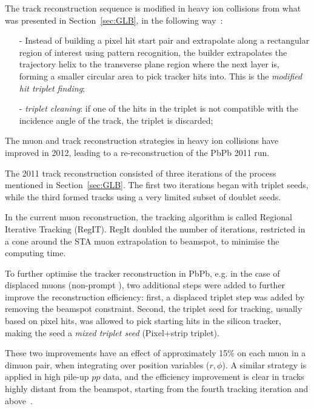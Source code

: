 The track reconstruction sequence is modified in heavy ion collisions from what
was presented in Section~\ref{sec:GLB}, in the following way~\cite{Denterria:2007xr}:

\begin{itemize}
\item[-] Instead of building a pixel hit start pair and extrapolate
  along a rectangular region of interest using pattern recognition,
  the builder extrapolates the trajectory helix to the transverse plane
  region where the next layer is, forming a smaller circular area to
  pick tracker hits into. This is the \textit{modified hit triplet finding};
\item[-] \textit{triplet cleaning}: if one of the hits in the triplet is not compatible with the
  incidence angle of the track, the triplet is discarded;
\end{itemize}


The muon and track reconstruction strategies in heavy ion collisions have improved in 2012, leading to a
re-reconstruction of the PbPb 2011 run. 

The 2011 track reconstruction consisted of three iterations of the
process mentioned in Section~\ref{sec:GLB}. The first two iterations
began with triplet seeds, while the third formed tracks using a
very limited subset of doublet seeds. 


In the current muon
reconstruction, the tracking algorithm is called Regional Iterative
Tracking (RegIT). RegIt doubled the number of iterations, restricted in a
cone around the STA muon extrapolation to beamspot, to minimise the
computing time. 

To further optimise the tracker reconstruction in
PbPb, e.g. in the case of displaced muons (non-prompt \Jpsi), two
additional steps were added to further improve the reconstruction
efficiency: first, a displaced triplet step was added by removing the beamspot
constraint. Second, the triplet seed for tracking, usually based on
pixel hits, was allowed to pick starting hits in the silicon tracker,
making the seed a \textit{mixed triplet seed} (Pixel+strip triplet).


These two improvements have an effect of approximately 15\% on each
muon in a dimuon pair, when integrating over position variables
($r,\phi$). A similar strategy is applied in high pile-up $pp$ data,
and the efficiency improvement is clear in tracks highly distant from
the beamspot, starting from the fourth tracking iteration and above~\cite{pileup}.



